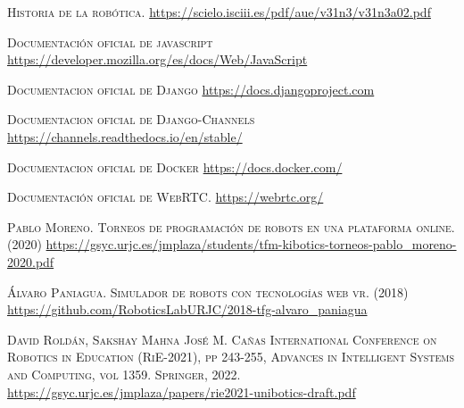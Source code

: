 \documentclass[a4paper, 12pt]{book}
\begin{document}



\cleardoublepage

\begin{thebibliography}{X}
	 \textsc{Historia de la robótica.}
	\url{https://scielo.isciii.es/pdf/aue/v31n3/v31n3a02.pdf}
	
	 \textsc{Documentación oficial de javascript}
	\url{https://developer.mozilla.org/es/docs/Web/JavaScript}	
	
	 \textsc{Documentacion oficial de Django}
	\url{https://docs.djangoproject.com}
	
	 \textsc{Documentacion oficial de Django-Channels}
	\url{https://channels.readthedocs.io/en/stable/}
	
	 \textsc{Documentacion oficial de Docker}
	\url{https://docs.docker.com/}
	
	 \textsc{Documentación oficial de WebRTC.}
	\url{https://webrtc.org/}
	
	 \textsc{Pablo Moreno. Torneos de programación de robots
en una plataforma online. (2020)}
	\url{https://gsyc.urjc.es/jmplaza/students/tfm-kibotics-torneos-pablo_moreno-2020.pdf}
	
	 \textsc{Álvaro Paniagua. Simulador de robots con tecnologías web vr. (2018)}
	\url{https://github.com/RoboticsLabURJC/2018-tfg-alvaro_paniagua}
	
	 \textsc{David Roldán, Sakshay Mahna José M. Cañas
International Conference on Robotics in Education (RiE-2021), pp 243-255,
Advances in Intelligent Systems and Computing, vol 1359. Springer, 2022.}
	\url{https://gsyc.urjc.es/jmplaza/papers/rie2021-unibotics-draft.pdf}
	
\end{thebibliography}
\end{document}
